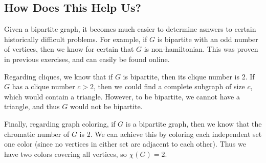 \subsection{How Does This Help Us?}
Given a bipartite graph, it becomes much easier to determine asnwers to certain historically difficult problems. For example, if $G$ is bipartite with an odd number of vertices, then we know for certain that $G$ is non-hamiltonian. This was proven in previous exercises, and can easily be found online. 

Regarding cliques, we know that if $G$ is bipartite, then its clique number is 2. If $G$ has a clique number $c > 2$, then we could find a complete subgraph of size $c$, which would contain a triangle. However, to be bipartite, we cannot have a triangle, and thus $G$ would not be bipartite. 

Finally, regarding graph coloring, if $G$ is a bipartite graph, then we know that the chromatic number of $G$ is 2. We can achieve this by coloring each independent set one color (since no vertices in either set are adjacent to each other). Thus we have two colors covering all vertices, so $\chi(G) = 2$.
